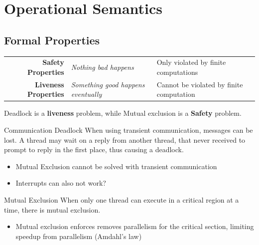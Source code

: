 \chapter{Operational Semantics}

\section{Formal Properties}
\begin{center}
	\begin{tabular}{r l l}
		\textbf{Safety Properties}   & \textit{Nothing bad happens}               & Only violated by finite computations     \\
		\textbf{Liveness Properties} & \textit{Something good happens eventually} & Cannot be violated by finite computation \\
	\end{tabular}
\end{center}
Deadlock is a \textbf{liveness} problem, while Mutual exclusion is a \textbf{Safety} problem.

\begin{definitionbox}{Communication Deadlock}
	When using transient communication, messages can be lost.
	A thread may wait on a reply from another thread, that never
	received to prompt to reply in the first place, thus causing a deadlock.
\end{definitionbox}

\begin{itemize}
	\item Mutual Exclusion cannot be solved with transient communication
	\item Interrupts can also not work?
\end{itemize}

\begin{definitionbox}{Mutual Exclusion}
	When only one thread can execute in a critical region at a time, there is mutual exclusion.
	\begin{itemize}
		\item Mutual exclusion enforces removes parallelism for the critical section, limiting speedup from parallelism (Amdahl's law)
	\end{itemize}
\end{definitionbox}

